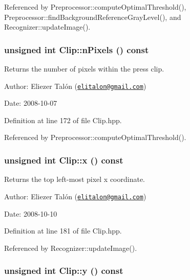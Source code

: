 Referenced by Preprocessor::computeOptimalThreshold(), Preprocessor::findBackgroundReferenceGrayLevel(), and Recognizer::updateImage().\hypertarget{class_clip_23ad153e40b62cc9178ff6b439ad7d92}{
\subsubsection[nPixels]{\setlength{\rightskip}{0pt plus 5cm}unsigned int Clip::nPixels () const}}
\label{class_clip_23ad153e40b62cc9178ff6b439ad7d92}


Returns the number of pixels within the press clip. 

\begin{Desc}
\item[Author:]Eliezer Talón (\href{mailto:elitalon@gmail.com}{\tt elitalon@gmail.com}) \end{Desc}
\begin{Desc}
\item[Date:]2008-10-07 \end{Desc}


Definition at line 172 of file Clip.hpp.

Referenced by Preprocessor::computeOptimalThreshold().\hypertarget{class_clip_de984337b7b13fb63a3d3b1797b544c8}{
\subsubsection[x]{\setlength{\rightskip}{0pt plus 5cm}unsigned int Clip::x () const}}
\label{class_clip_de984337b7b13fb63a3d3b1797b544c8}


Returns the top left-most pixel x coordinate. 

\begin{Desc}
\item[Author:]Eliezer Talón (\href{mailto:elitalon@gmail.com}{\tt elitalon@gmail.com}) \end{Desc}
\begin{Desc}
\item[Date:]2008-10-10 \end{Desc}


Definition at line 181 of file Clip.hpp.

Referenced by Recognizer::updateImage().\hypertarget{class_clip_998a62506ffab457184ec7083cb154e4}{
\subsubsection[y]{\setlength{\rightskip}{0pt plus 5cm}unsigned int Clip::y () const}}
\label{class_clip_998a62506ffab457184ec7083cb154e4}


